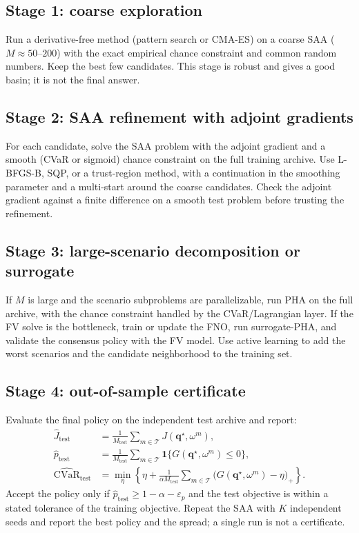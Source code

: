 \documentclass[11pt]{article}
\numberwithin{equation}{section}
\newcommand{\qq}{\mathbf{q}}
\newcommand{\CVaR}{\operatorname{CVaR}}
\newcommand{\ind}{\mathbf{1}}
\theoremstyle{plain}
\begin{document}
\subsection{Stage 1: coarse exploration}

Run a derivative-free method (pattern search or CMA-ES) on a coarse SAA
($M\approx50$--$200$) with the exact empirical chance constraint and common
random numbers.  Keep the best few candidates.  This stage is robust and gives
a good basin; it is not the final answer.

\subsection{Stage 2: SAA refinement with adjoint gradients}

For each candidate, solve the SAA problem with the adjoint gradient and a
smooth (CVaR or sigmoid) chance constraint on the full training archive.  Use
L-BFGS-B, SQP, or a trust-region method, with a continuation in the smoothing
parameter and a multi-start around the coarse candidates.  Check the adjoint
gradient against a finite difference on a smooth test problem before trusting
the refinement.

\subsection{Stage 3: large-scenario decomposition or surrogate}

If $M$ is large and the scenario subproblems are parallelizable, run PHA on
the full archive, with the chance constraint handled by the CVaR/Lagrangian
layer.  If the FV solve is the bottleneck, train or update the FNO, run
surrogate-PHA, and validate the consensus policy with the FV model.  Use
active learning to add the worst scenarios and the candidate neighborhood to
the training set.

\subsection{Stage 4: out-of-sample certificate}

Evaluate the final policy on the independent test archive and report:
\begin{align}
\hat J_{\mathrm{test}}
&=\frac{1}{M_{\mathrm{test}}}\sum_{m\in\mathcal{T}}J(\qq^\star,\omega^m),
\label{eq:Jtest}\\
\hat p_{\mathrm{test}}
&=\frac{1}{M_{\mathrm{test}}}\sum_{m\in\mathcal{T}}
\ind\{G(\qq^\star,\omega^m)\le0\},
\label{eq:ptest}\\
\widehat{\CVaR}_{\mathrm{test}}
&=\min_{\eta}\left\{\eta+\frac{1}{\alpha M_{\mathrm{test}}}
\sum_{m\in\mathcal{T}}\bigl(G(\qq^\star,\omega^m)-\eta\bigr)_+
\right\}.
\label{eq:cvartest}
\end{align}
Accept the policy only if $\hat p_{\mathrm{test}}\ge1-\alpha-\varepsilon_p$
and the test objective is within a stated tolerance of the training objective.
Repeat the SAA with $K$ independent seeds and report the best policy and the
spread; a single run is not a certificate.
\end{document}

